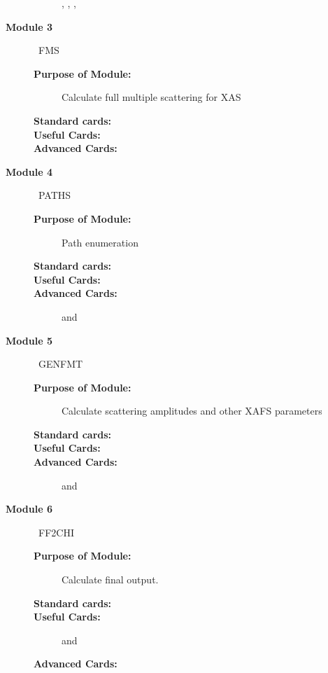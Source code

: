 \documentclass[11pt,oneside]{report} %
\begin{document}
\begin{description}
\begin{description}
    , ,
    , 
  \end{description}
\item[\large\textbf{Module 3}]\dotfill\  {\large\textrm{FMS}}
  \begin{description}
  \item[\textbf{Purpose of Module:}] Calculate full multiple
    scattering for XAS
  \item[\textbf{Standard cards:}] 
  \item[\textbf{Useful Cards:}] 
  \item[\textbf{Advanced Cards:}]
  \end{description}
\item[\large\textbf{Module 4}]\dotfill\  {\large\textrm{PATHS}}
  \begin{description}
  \item[\textbf{Purpose of Module:}] Path enumeration
  \item[\textbf{Standard cards:}] 
  \item[\textbf{Useful Cards:}] 
  \item[\textbf{Advanced Cards:}]  and
  \end{description}
\item[\large\textbf{Module 5}]\dotfill\  {\large\textrm{GENFMT}}
  \begin{description}
  \item[\textbf{Purpose of Module:}] Calculate scattering amplitudes
    and other XAFS parameters
  \item[\textbf{Standard cards:}]
  \item[\textbf{Useful Cards:}] 
  \item[\textbf{Advanced Cards:}]  and
  \end{description}
\item[\large\textbf{Module 6}]\dotfill\  {\large\textrm{FF2CHI}}
  \begin{description}
  \item[\textbf{Purpose of Module:}] Calculate final output. 
  \item[\textbf{Standard cards:}] 
  \item[\textbf{Useful Cards:}]  and
  \item[\textbf{Advanced Cards:}]
  \end{description}
\end{description}
\end{document}
